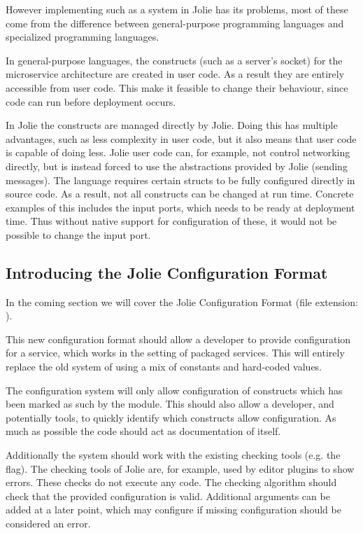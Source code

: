 

However implementing such as a system in Jolie has its problems, most of these
come from the difference between general-purpose programming languages and
specialized programming languages.

In general-purpose languages, the constructs (such as a server's socket) for
the microservice architecture are created in user code. As a result they are
entirely accessible from user code. This make it feasible to change their
behaviour, since code can run before deployment occurs.

In Jolie the constructs are managed directly by Jolie. Doing this has multiple
advantages, such as less complexity in user code, but it also means that user
code is capable of doing less. Jolie user code can, for example, not control
networking directly, but is instead forced to use the abstractions provided by
Jolie (sending messages).  The language requires certain structs to be fully
configured directly in source code. As a result, not all constructs can be
changed at run time.  Concrete examples of this includes the input ports, which
needs to be ready at deployment time. Thus without native support for
configuration of these, it would not be possible to change the input port.

\subsection{Introducing the Jolie Configuration Format}
\label{sec:conf_units}

In the coming section we will cover the Jolie Configuration Format (file
extension: ).


This new configuration format should allow a developer to provide configuration
for a service, which works in the setting of packaged services. This will
entirely replace the old system of using a mix of constants and hard-coded
values.

The configuration system will only allow configuration of constructs which has
been marked as such by the module. This should also allow a developer, and
potentially tools, to quickly identify which constructs allow configuration.
As much as possible the code should act as documentation of itself.

Additionally the system should work with the existing checking tools (e.g. the
 flag). The checking tools of Jolie are, for example,
used by editor plugins to show errors. These checks do not execute
any code. The checking algorithm should check that the provided
configuration is valid. Additional arguments can be added at a
later point, which may configure if missing configuration should
be considered an error.

